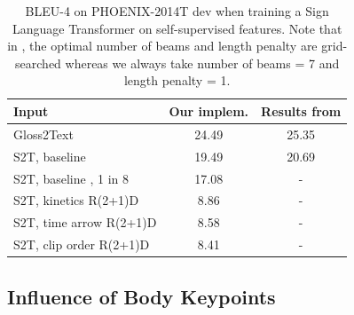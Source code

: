 \documentclass[final]{cvpr}
\begin{document}
\begin{table}[H]
	\centering
	\def\arraystretch{0.9}
	\setlength{\tabcolsep}{0.2em}
	\begin{tabular}{l c c}
		\toprule
		Input   & Our implem.   & Results from \cite{neccam} \\
		\midrule
		Gloss2Text   &  24.49 & 25.35 \\
		S2T, baseline \cite{hmm}   &  19.49 & 20.69  \\
		S2T, baseline \cite{hmm}, 1 in 8   &  17.08  &  -  \\
		S2T, kinetics R(2+1)D &  8.86 &  -  \\
		S2T, time arrow R(2+1)D  &  8.58 & - \\
		S2T, clip order R(2+1)D  &  8.41 & - \\
		\bottomrule
	\end{tabular}
	\caption{BLEU-4 on PHOENIX-2014T dev when training a Sign Language Transformer on self-supervised features. Note that in \cite{neccam}, the optimal number of beams and length penalty are grid-searched whereas we always take number of beams = 7 and length penalty = 1. }
	\label{tab:self-sup}
\end{table}


\subsection{Influence of Body Keypoints}
\end{document}
